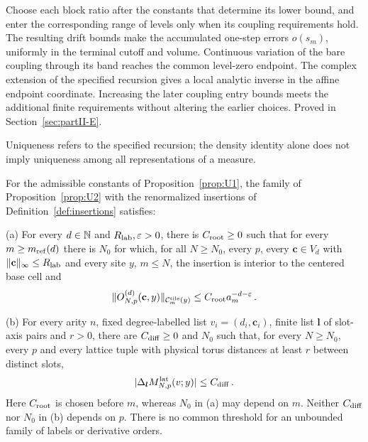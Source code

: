Choose each block ratio after the constants that determine its lower bound,
and enter the corresponding range of levels only when its coupling requirements
hold. The resulting drift bounds make the accumulated one-step errors
$o(s_m)$, uniformly in the terminal cutoff and volume. Continuous variation of
the bare coupling through its band reaches the common level-zero endpoint.
The complex extension of the specified recursion gives a local analytic inverse
in the affine endpoint coordinate. Increasing the later coupling entry bounds
meets the additional finite requirements without altering the earlier choices.
Proved in Section~\ref{sec:partII-E}.

\begin{remark}
Uniqueness refers to the specified recursion; the density identity alone does not imply uniqueness among all representations of a measure.
\end{remark}

\begin{proposition}\label{prop:U3}
For the admissible constants of Proposition~\ref{prop:U1}, the family of Proposition~\ref{prop:U2} with the renormalized insertions of Definition~\ref{def:insertions} satisfies:

(a) For every $d\in\mathbb{N}$ and $R_{\rm lab},\varepsilon>0$, there is $C_{\rm root}\ge0$ such that for every $m\ge m_{\mathrm{ref}}(d)$ there is $N_0$ for which, for all $N\ge N_0$, every $p$, every $\mathbf c\in V_d$ with $\|\mathbf c\|_\infty\le R_{\rm lab}$ and every site $y$, $m\le N$, the insertion is interior to the centered base cell and
\begin{equation}\label{eq:U3-1}
\|O^{(d)}_{N,p}(\mathbf c,y)\|_{\mathcal C_m^{\rm tile}(y)}\le C_{\rm root}a_m^{-d-\varepsilon}\,.
\end{equation}

(b) For every arity $n$, fixed degree-labelled list $v_i=(d_i,\mathbf c_i)$, finite list $\boldsymbol l$ of slot-axis pairs and $r>0$, there are $C_{\rm diff}\ge0$ and $N_0$ such that, for every $N\ge N_0$, every $p$ and every lattice tuple with physical torus distances at least $r$ between distinct slots,
\begin{equation}\label{eq:U3-2}
|\Delta_{\boldsymbol l}M^{\mathrm{lat}}_{N,p}(v;y)|\le C_{\rm diff}\,.
\end{equation}
Here $C_{\rm root}$ is chosen before $m$, whereas $N_0$ in (a) may depend on $m$. Neither $C_{\rm diff}$ nor $N_0$ in (b) depends on $p$. There is no common threshold for an unbounded family of labels or derivative orders.
\end{proposition}

